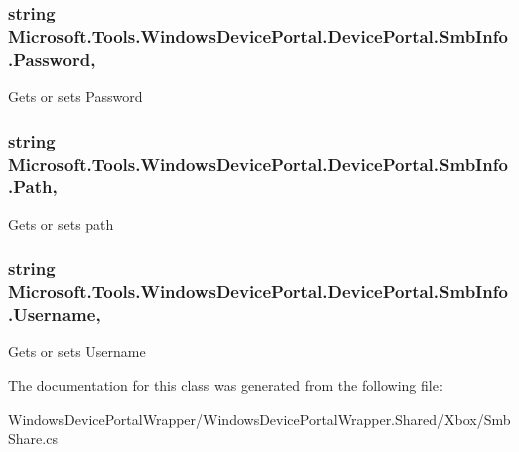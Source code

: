 \subsubsection[{\texorpdfstring{Password}{Password}}]{\setlength{\rightskip}{0pt plus 5cm}string Microsoft.\+Tools.\+Windows\+Device\+Portal.\+Device\+Portal.\+Smb\+Info.\+Password\hspace{0.3cm}{\ttfamily [get]}, {\ttfamily [set]}}\hypertarget{class_microsoft_1_1_tools_1_1_windows_device_portal_1_1_device_portal_1_1_smb_info_a061ed6861646f8f5a5e5e71d42a7ea8d}{}\label{class_microsoft_1_1_tools_1_1_windows_device_portal_1_1_device_portal_1_1_smb_info_a061ed6861646f8f5a5e5e71d42a7ea8d}


Gets or sets Password 

\subsubsection[{\texorpdfstring{Path}{Path}}]{\setlength{\rightskip}{0pt plus 5cm}string Microsoft.\+Tools.\+Windows\+Device\+Portal.\+Device\+Portal.\+Smb\+Info.\+Path\hspace{0.3cm}{\ttfamily [get]}, {\ttfamily [set]}}\hypertarget{class_microsoft_1_1_tools_1_1_windows_device_portal_1_1_device_portal_1_1_smb_info_ae4a3573df8270c0de37a0176ad224435}{}\label{class_microsoft_1_1_tools_1_1_windows_device_portal_1_1_device_portal_1_1_smb_info_ae4a3573df8270c0de37a0176ad224435}


Gets or sets path 

\subsubsection[{\texorpdfstring{Username}{Username}}]{\setlength{\rightskip}{0pt plus 5cm}string Microsoft.\+Tools.\+Windows\+Device\+Portal.\+Device\+Portal.\+Smb\+Info.\+Username\hspace{0.3cm}{\ttfamily [get]}, {\ttfamily [set]}}\hypertarget{class_microsoft_1_1_tools_1_1_windows_device_portal_1_1_device_portal_1_1_smb_info_a2f73724271afae4c1996b9a56da75296}{}\label{class_microsoft_1_1_tools_1_1_windows_device_portal_1_1_device_portal_1_1_smb_info_a2f73724271afae4c1996b9a56da75296}


Gets or sets Username 



The documentation for this class was generated from the following file\+:\begin{DoxyCompactItemize}
\item 
Windows\+Device\+Portal\+Wrapper/\+Windows\+Device\+Portal\+Wrapper.\+Shared/\+Xbox/Smb\+Share.\+cs\end{DoxyCompactItemize}
